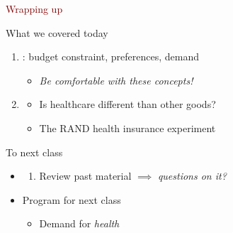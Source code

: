 \begin{frame}{}
    \begin{center}
    \Large \textcolor{maroon}{Wrapping up}
    \end{center}

\end{frame}
\begin{frame}{What we covered today}
    \begin{enumerate}
        \item {}: budget constraint, preferences, demand
        \begin{itemize}
            \item \textit{Be comfortable with these concepts!}
        \end{itemize}
        \vspace{5mm}
    
        \item {}
        \begin{itemize}
            \item Is healthcare different than other goods? 
            \item The RAND health insurance experiment
        \end{itemize}
    \end{enumerate}
\end{frame}
\begin{frame}{To next class}
    \begin{itemize}
        \item {}
        \begin{enumerate}
            \item Review past material $\implies$ \textit{questions on it?}
        \end{enumerate}
        \vspace{5mm}

        \item Program for next class
        \begin{itemize}
            \item Demand for \textit{health}
        \end{itemize}
    \end{itemize}
\end{frame}
